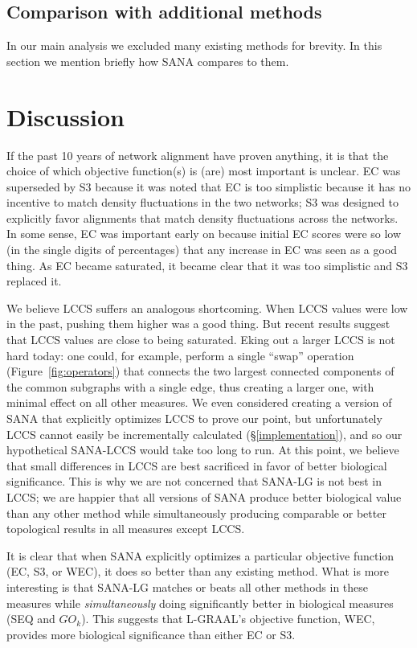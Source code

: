 \documentclass{bioinfo}
\begin{document}
\subsection{Comparison with additional methods}
In our main analysis we excluded many existing methods for brevity. In this section we mention briefly how SANA compares to them.


\section{Discussion}

If the past 10 years of network alignment have proven anything, it is that the choice of which objective function(s) is (are) most important is unclear. EC was superseded by S3 because it was noted that EC is too simplistic because it has no incentive to match density fluctuations in the two networks; S3 was designed to explicitly favor alignments that match density fluctuations across the networks.  In some sense, EC was important early on because initial EC scores were so low (in the single digits of percentages) that any increase in EC was seen as a good thing.  As EC became saturated, it became clear that it was too simplistic and S3 replaced it.

We believe LCCS suffers an analogous shortcoming.  When LCCS values were low in the past, pushing them higher was a good thing.  But recent results suggest that LCCS values are close to being saturated. Eking out a larger LCCS is not hard today: one could, for example, perform a single ``swap'' operation (Figure~\ref{fig:operators}) that connects the two largest connected components of the common subgraphs with a single edge, thus creating a larger one, with minimal effect on all other measures. We even considered creating a version of SANA that explicitly optimizes LCCS to prove our point, but unfortunately LCCS cannot easily be incrementally calculated (\S \ref{implementation}), and so our hypothetical SANA-LCCS would take too long to run.  At this point, we believe that small differences in LCCS are best sacrificed in favor of better biological significance.  This is why we are not concerned that SANA-LG is not best in LCCS; we are happier that all versions of SANA produce better biological value than any other method while simultaneously producing comparable or better topological results in all measures except LCCS.

It is clear that when SANA explicitly optimizes a particular objective function (EC, S3, or WEC), it does so better than any existing method. What is more interesting is that SANA-LG matches or beats all other methods in these measures while {\em simultaneously} doing significantly better in biological measures (SEQ and $GO_k$). This suggests that L-GRAAL's objective function, WEC, provides more biological significance than either EC or S3.
\end{document}
